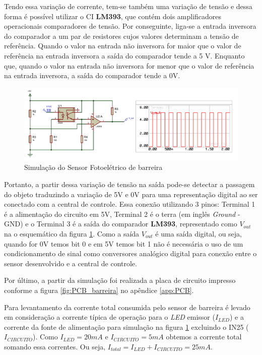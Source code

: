     Tendo essa variação de corrente, tem-se também uma variação de tensão e dessa forma é possível utilizar o CI \textbf{LM393}, que contém dois amplificadores operacionais comparadores de tensão. Por conseguinte, liga-se a entrada inversora do comparador a um par de resistores cujos valores determinam a tensão de referência. Quando o valor na entrada não inversora for maior que o valor de referência na entrada inversora a saída do comparador tende a 5 V. Enquanto que, quando o valor na entrada não inversora for menor que o valor de referência na entrada inversora, a saída do comparador tende a 0V. 
    
    
    \begin{figure}[H]
    \centering
    \includegraphics[scale=0.65]{figuras/Sim_sensor_barreir_3.PDF}
    \caption{Simulação do Sensor Fotoelétrico de barreira}
    \label{fig:sim_sensor_barreira}
    \end{figure}
    
     Portanto, a partir dessa variação de tensão na saída pode-se detectar a passagem do objeto traduzindo a variação de 5V e 0V para uma representação digital ao ser conectado com a central de controle. Essa conexão utilizando 3 pinos: Terminal 1 é a alimentação do circuito em 5V, Terminal 2 é o terra (em inglês \textit{Ground} - GND) e o Terminal 3 é a saída do comparador \textbf{LM393}, representado como $V_{out}$ na o esquemático da figura \ref{fig:sim_sensor_barreira}. Como a saída $V_{out}$ é uma saída digital, ou seja, quando for 0V temos bit 0 e em 5V temos bit 1 não é necessária o uso de um condicionamento de sinal como conversores analógico digital para conexão entre o sensor desenvolvido e a central de controle.

    
    Por último, a partir da simulação foi realizada a placa de circuito impresso conforme a figura  \ref{fig:PCB_barreira} no apêndice \ref{app:PCB}.  
    

    Para levantamento da corrente total consumida pelo sensor de barreira é levado em consideração a corrente típica de operação para o \textit{LED} emissor ($I_{LED}$) e a corrente da fonte de alimentação para simulação na figura \ref{fig:sim_sensor_barreira} excluindo o IN25 ($I_{CIRCUITO}$). Como $I_{LED} = 20 mA $ e $I_{CIRCUITO} = 5mA$  obtemos a corrente total somando essa correntes. Ou seja, $I_{total} = I_{LED} + I_{CIRCUITO} = 25mA$.  

